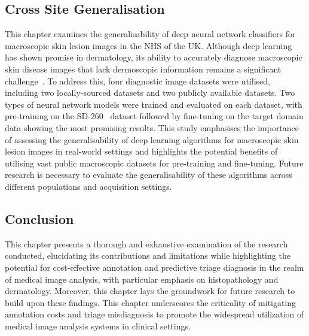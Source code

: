 \subsection*{Cross Site Generalisation}
This chapter examines the generalisability of deep neural network classifiers for macroscopic skin lesion images in the NHS of the UK. Although deep learning has shown promise in dermatology, its ability to accurately diagnose macroscopic skin disease images that lack dermoscopic information remains a significant challenge~\citep{jones2022artificial}. To address this, four diagnostic image datasets were utilised, including two locally-sourced datasets and two publicly available datasets. Two types of neural network models were trained and evaluated on each dataset, with pre-training on the SD-260~\citep{yang2019self} dataset followed by fine-tuning on the target domain data showing the most promising results. This study emphasises the importance of assessing the generalisability of deep learning algorithms for macroscopic skin lesion images in real-world settings and highlights the potential benefits of utilising vast public macroscopic datasets for pre-training and fine-tuning. Future research is necessary to evaluate the generalisability of these algorithms across different populations and acquisition settings.

\subsection*{Conclusion}
This chapter presents a thorough and exhaustive examination of the research conducted, elucidating its contributions and limitations while highlighting the potential for cost-effective annotation and predictive triage diagnosis in the realm of medical image analysis, with particular emphasis on histopathology and dermatology. Moreover, this chapter lays the groundwork for future research to build upon these findings. This chapter underscores the criticality of mitigating annotation costs and triage misdiagnosis to promote the widespread utilization of medical image analysis systems in clinical settings.